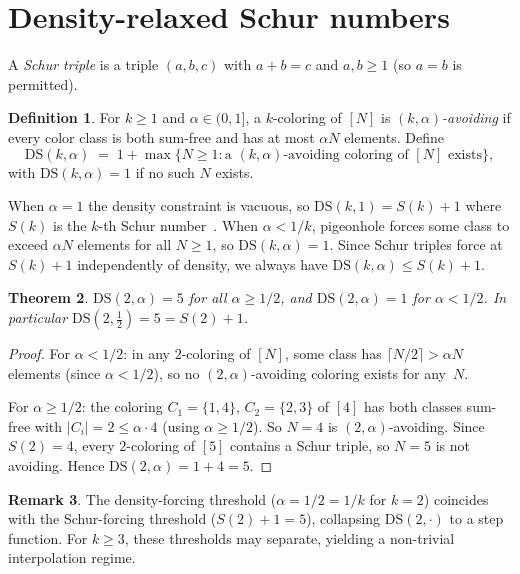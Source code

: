 \documentclass[11pt]{article}
\theoremstyle{plain}
\newtheorem{theorem}{Theorem}[section]
\theoremstyle{definition}
\newtheorem{definition}[theorem]{Definition}
\newtheorem{remark}[theorem]{Remark}
\newcommand{\DS}{\mathrm{DS}}
\begin{document}
\section{Density-relaxed Schur numbers}\label{sec:ds}

A \emph{Schur triple} is a triple $(a,b,c)$ with $a+b=c$ and
$a,b\ge 1$ (so $a=b$ is permitted).

\begin{definition}\label{def:ds}
For $k\ge 1$ and $\alpha\in(0,1]$, a $k$-coloring of $[N]$ is
\emph{$(k,\alpha)$-avoiding} if every color class is both sum-free
and has at most $\alpha N$ elements. Define
\[
\DS(k,\alpha) \;=\; 1+\max\{N\ge 1: \text{a $(k,\alpha)$-avoiding
coloring of $[N]$ exists}\},
\]
with $\DS(k,\alpha)=1$ if no such $N$ exists.
\end{definition}

When $\alpha=1$ the density constraint is vacuous, so
$\DS(k,1)=S(k)+1$ where $S(k)$ is the $k$-th Schur
number~\cite{schur1916}. When $\alpha<1/k$, pigeonhole forces some
class to exceed $\alpha N$ elements for all $N\ge 1$, so
$\DS(k,\alpha)=1$. Since Schur triples force at $S(k)+1$
independently of density, we always have $\DS(k,\alpha)\le S(k)+1$.

\begin{theorem}\label{thm:ds}
$\DS(2,\alpha)=5$ for all $\alpha\ge 1/2$, and $\DS(2,\alpha)=1$ for
$\alpha<1/2$. In particular $\DS(2,\tfrac{1}{2})=5=S(2)+1$.
\end{theorem}

\begin{proof}
For $\alpha<1/2$: in any $2$-coloring of $[N]$, some class has
$\lceil N/2\rceil>\alpha N$ elements (since $\alpha<1/2$), so no
$(2,\alpha)$-avoiding coloring exists for any~$N$.

For $\alpha\ge 1/2$: the coloring $C_1=\{1,4\}$, $C_2=\{2,3\}$ of
$[4]$ has both classes sum-free with $|C_i|=2\le\alpha\cdot 4$
(using $\alpha\ge 1/2$). So $N=4$ is $(2,\alpha)$-avoiding.
Since $S(2)=4$, every $2$-coloring of $[5]$ contains a Schur
triple, so $N=5$ is not avoiding. Hence $\DS(2,\alpha)=1+4=5$.
\end{proof}

\begin{remark}\label{rem:transition}
The density-forcing threshold ($\alpha=1/2=1/k$ for $k=2$)
coincides with the Schur-forcing threshold ($S(2)+1=5$),
collapsing $\DS(2,\cdot)$ to a step function. For $k\ge 3$, these
thresholds may separate, yielding a non-trivial interpolation regime.
\end{remark}
\end{document}
